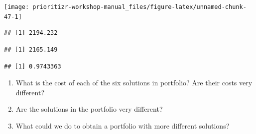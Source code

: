 \documentclass[12pt,]{book}
\newenvironment{Shaded}{\begin{snugshade}}{\end{snugshade}}
\newcommand{\KeywordTok}[1]{\textcolor[rgb]{0.13,0.29,0.53}{\textbf{#1}}}
\newcommand{\DecValTok}[1]{\textcolor[rgb]{0.00,0.00,0.81}{#1}}
\newcommand{\StringTok}[1]{\textcolor[rgb]{0.31,0.60,0.02}{#1}}
\newcommand{\CommentTok}[1]{\textcolor[rgb]{0.56,0.35,0.01}{\textit{#1}}}
\newcommand{\OperatorTok}[1]{\textcolor[rgb]{0.81,0.36,0.00}{\textbf{#1}}}
\newcommand{\NormalTok}[1]{#1}
\providecommand{\tightlist}{%
  \setlength{\itemsep}{0pt}\setlength{\parskip}{0pt}}
\let\BeginKnitrBlock\begin \let\EndKnitrBlock\end
\begin{document}
\begin{center}\texttt{[image: prioritizr-workshop-manual\_files/figure-latex/unnamed-chunk-47-1]} \end{center}

\begin{Shaded}
\end{Shaded}

\begin{verbatim}
## [1] 2194.232
\end{verbatim}

\begin{Shaded}
\end{Shaded}

\begin{verbatim}
## [1] 2165.149
\end{verbatim}

\begin{Shaded}
\end{Shaded}

\begin{verbatim}
## [1] 0.9743363
\end{verbatim}

\BeginKnitrBlock{rmdquestion}
\begin{enumerate}
\def\labelenumi{\arabic{enumi}.}
\tightlist
\item
  What is the cost of each of the six solutions in portfolio? Are their
  costs very different?
\item
  Are the solutions in the portfolio very different?
\item
  What could we do to obtain a portfolio with more different solutions?
\end{enumerate}
\EndKnitrBlock{rmdquestion}
\end{document}
